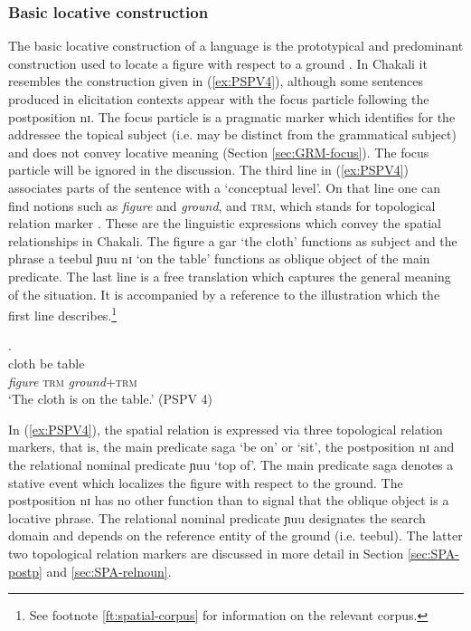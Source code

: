 % 

\subsubsection{Basic locative construction}
\label{sec:SPA-blc}


The  basic locative construction  of a language 
is  the prototypical  and predominant construction used to locate a figure with 
respect to a ground \citep[15]{Levi06}. In Chakali it resembles the 
construction given in (\ref{ex:PSPV4}), although some sentences produced in 
elicitation contexts appear with the focus particle following the 
postposition {\sls nɪ}.  The focus particle  is a pragmatic 
marker which identifies for the addressee the topical subject (i.e. may be 
distinct from the grammatical subject) and does not convey locative meaning 
(Section \ref{sec:GRM-focus}). The focus particle will be ignored in the 
discussion. The third  line  in (\ref{ex:PSPV4}) associates parts of the 
sentence with a `conceptual level'. On that line one can find notions such as 
{\it figure} and {\it ground},  and \textsc{trm}, which stands for 
 topological relation marker 
\citep[see][]{Brin12}. These are the linguistic expressions which convey  the 
spatial relationships in Chakali.  The figure {\sls a gar} `the cloth'  
functions as subject and the phrase {\sls a teebul ɲuu nɪ} `on the table' 
functions as  oblique object  of the main predicate. The last line is a free 
translation which captures  the general meaning of the situation. It is 
accompanied by a reference to the illustration which the first line 
describes.\footnote{See footnote \ref{ft:spatial-corpus} for information on the 
relevant corpus.}


\begin{exe}
\ex\label{ex:PSPV4}
\glll  [à gár] [ságá] [à {téébùl ɲúù} nɪ̀].\\
{\art} cloth be {\art}  {table {\reln}}  {\postp}\\
 \textit{figure} {} \textsc{trm}  {} {\textit{ground}+\textsc{trm}}  {} \\
\glt `The cloth is on the table.' (PSPV 4)
\end{exe}


In (\ref{ex:PSPV4}), the spatial relation is expressed via three topological
relation markers, that is,  the main predicate {\sls saga} `be on' or `sit', the
postposition  {\sls nɪ} and the relational nominal predicate {\sls ɲuu} `top 
of'.
The main predicate  {\sls saga}  denotes a stative event which  localizes the
figure with respect to the ground.  The postposition  {\sls nɪ} has no other
function than to signal that the oblique object is a locative phrase. The
relational nominal predicate {\sls ɲuu} designates the search domain and depends
on the reference entity of the ground (i.e. {\sls teebul}). The latter 
two topological
relation markers are discussed in more detail in Section 
\ref{sec:SPA-postp} and  \ref{sec:SPA-relnoun}.



